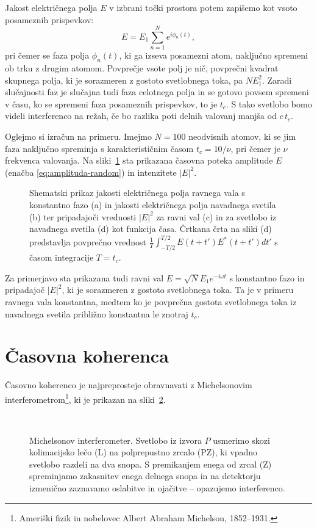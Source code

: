 Jakost električnega polja $E$ v izbrani točki prostora potem 
zapišemo kot vsoto posameznih prispevkov:
\begin{equation}
E=E_{1}\sum_{n=1}^{N}e^{i\phi_{n}(t)},
\label{eq:amplituda-random}
\end{equation}
pri čemer se faza polja $\phi_{n}(t)$, ki ga izseva posamezni atom, naključno
spremeni ob trku z drugim atomom. Povprečje vsote polj je nič, 
povprečni kvadrat skupnega polja, ki je sorazmeren
z gostoto svetlobnega toka, pa $NE_{1}^{2}$. Zaradi slučajnosti faz je 
slučajna tudi faza celotnega polja in se gotovo povsem spremeni v času, ko se
spremeni faza posameznih prispevkov, to je $t_{c}$. S tako svetlobo bomo videli 
interferenco na režah, če bo razlika poti delnih valovanj manjša od $c\, t_{c}$.

Oglejmo si izračun
na primeru. Imejmo $N=100$ neodvisnih atomov, ki se jim faza naključno
spreminja s karakterističnim časom $t_{c}=10/\nu$, pri čemer je $\nu$
frekvenca valovanja. Na sliki~\ref{fig:amplituda-intenziteta} sta
prikazana časovna poteka amplitude $E$ (enačba \ref{eq:amplituda-random})
in intenzitete $|E|^{2}$.
\begin{figure}[ht]
\centering
\def\svgwidth{128truemm} 

\caption{Shematski prikaz jakosti električnega polja 
ravnega vala s konstantno fazo (a) in jakosti električnega
polja navadnega svetila (b) ter
pripadajoči vrednosti $|E|^2$ za ravni val (c) in za
svetlobo iz navadnega svetila (d) kot funkcija
časa. Črtkana črta na sliki (d) predstavlja povprečno vrednost
$\frac{1}{T}\int_{-T/2}^{T/2}E(t+t')E^{*}(t+t')dt'$
s časom integracije $T=t_{c}$.}
\label{fig:amplituda-intenziteta}
\end{figure}

Za primerjavo sta prikazana tudi ravni val $E=\sqrt{N}E_{1}e^{-i\omega t}$
s konstantno fazo in pripadajoč $|E|^{2}$, ki je sorazmeren z gostoto svetlobnega
toka. Ta je v primeru ravnega vala konstantna, medtem ko je povprečna gostota
svetlobnega toka iz navadnega svetila približno konstantna le znotraj $t_{c}$.

\section{Časovna koherenca}
\label{sec:casovna-koherenca}

Časovno koherenco je najpreprosteje obravnavati 
z Michelsonovim 
interferometrom\footnote{Ameriški fizik in nobelovec Albert Abraham Michelson, 1852--1931.},
ki je prikazan na sliki~\ref{fig:michelson}. 
\begin{figure}[ht]
\centering
\def\svgwidth{70truemm} 
\\
\caption{\label{fig:michelson}Michelsonov interferometer. Svetlobo
iz izvora $P$ usmerimo skozi kolimacijsko lečo (L) na polprepustno
zrcalo (PZ), ki vpadno svetlobo razdeli na dva snopa. S premikanjem 
enega od zrcal (Z) spreminjamo zakasnitev enega delnega snopa in
na detektorju izmenično zaznavamo oslabitve in ojačitve -- opazujemo interferenco.}
\end{figure}

